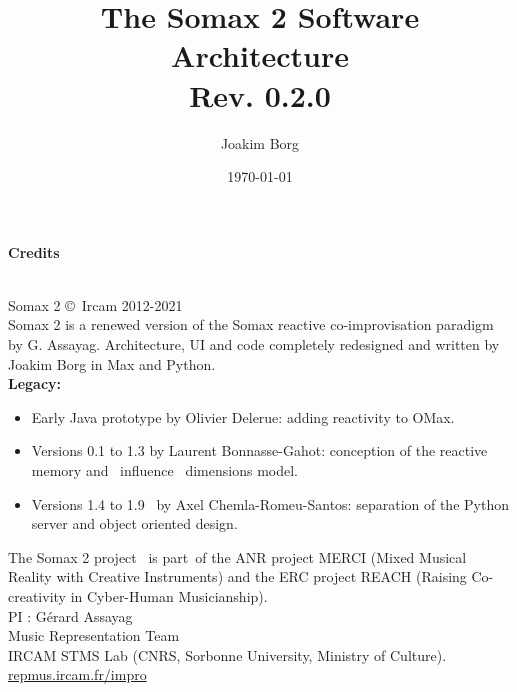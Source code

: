 \documentclass[10pt]{report}
\title{The Somax 2 Software Architecture\\[0.24cm]
	\large{Rev. 0.2.0}}
\author{Joakim Borg }
\date{\today}
\begin{document}
\maketitle
\chapter*{}
\large{\textbf{Credits}\\}\\
\small{
Somax 2 \copyright \ Ircam 2012-2021\\

\noindent Somax 2 is a renewed version of the Somax reactive co-improvisation paradigm by G. Assayag.
Architecture, UI and code completely redesigned and written by Joakim Borg in Max and Python.
\\

\noindent \textbf{Legacy:}
\begin{itemize}
\item Early Java prototype by Olivier Delerue: adding reactivity to OMax.
\item Versions 0.1 to 1.3 by Laurent Bonnasse-Gahot: conception of the reactive memory and  influence  dimensions model.
\item Versions 1.4 to 1.9  by Axel Chemla-Romeu-Santos: separation of the Python server and object oriented design.
\end{itemize}

\medskip
\noindent The Somax 2 project  is part of the ANR project MERCI (Mixed Musical Reality with Creative Instruments) and the ERC project REACH (Raising Co-creativity in Cyber-Human Musicianship).
\\

\noindent PI : Gérard Assayag\\
Music Representation Team\\
IRCAM STMS Lab (CNRS, Sorbonne University, Ministry of Culture).
\\

\noindent\url{repmus.ircam.fr/impro}
}


\tableofcontents







{}

\end{document}

